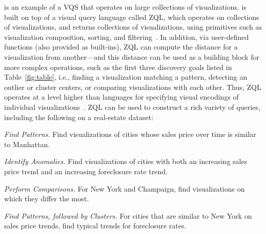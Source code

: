 \zv is an example of a VQS that operates on 
large collections of visualizations.
\zv is built on top of a visual query language
called ZQL, which operates on collections of visualizations, and returns
collections of visualizations,
using primitives such as visualization composition,
sorting, and filtering~\cite{Siddiqui2016}. 
In addition, via user-defined functions (also provided as built-ins),
ZQL can compute the distance for a visualization from another---and this
distance can be used as a building block for more complex
operations, such as the first three discovery goals listed
in Table~\ref{fig:table}, i.e., finding a visualization
matching a pattern, detecting an outlier or cluster centers,
or comparing visualizations with each other.
Thus, ZQL operates at a level higher than
languages for specifying visual encodings of
individual visualizations~\cite{Stolte2002,Wilkinson2005}.
ZQL can be used to construct a rich variety of queries,
including the following on a real-estate dataset:
\squishlist
	\item {\em Find Patterns.} Find visualizations of cities whose sales price over time is similar to Manhattan. 
	\item {\em Identify Anomalies.} Find visualizations of cities with both an increasing sales price trend and an increasing foreclosure rate trend.
	\item {\em Perform Comparisons.} For New York and Champaign, find visualizations on which they differ the most.
	\item {\em Find Patterns, followed by Clusters.} For cities that are similar
	to New York on sales price trends, find typical trends for foreclosure rates.
\squishend

